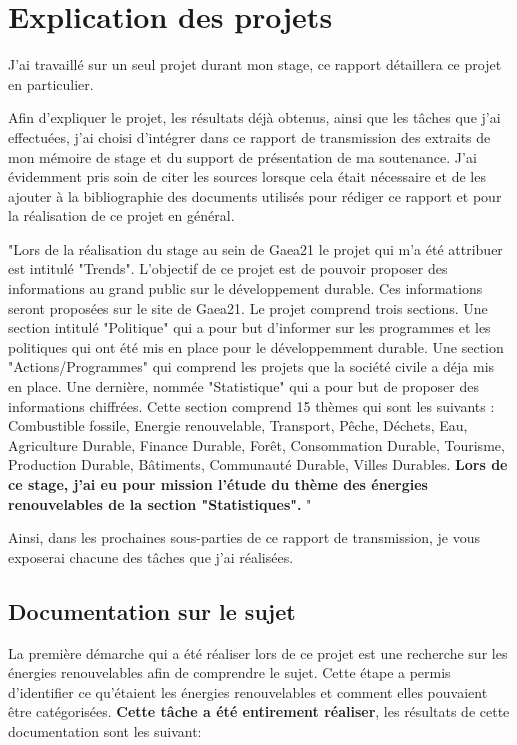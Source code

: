 \documentclass[12pt]{article}
\begin{document}
\section{Explication des projets}

J'ai travaillé sur un seul projet durant mon stage,
 ce rapport détaillera ce projet en particulier. \newline

 Afin d'expliquer le projet, les résultats déjà obtenus, 
 ainsi que les tâches que j'ai effectuées, j'ai choisi 
 d'intégrer dans ce rapport de transmission des extraits 
 de mon mémoire de stage et du support de présentation de 
 ma soutenance. J'ai évidemment pris soin de citer les sources 
 lorsque cela était nécessaire et de les ajouter à la bibliographie 
 des documents utilisés pour rédiger ce rapport et pour la 
 réalisation de ce projet en général.\newline

"Lors de la réalisation du stage au sein de Gaea21 le projet 
qui m'a été attribuer est 
intitulé "Trends".
L'objectif de ce projet
est de pouvoir proposer des informations au grand public sur le développement durable. 
Ces informations seront proposées sur le site de Gaea21. Le projet comprend 
trois sections. 
Une section intitulé "Politique" qui a pour but d'informer sur 
les programmes et les politiques qui ont été mis en place pour le
développemment durable. 
Une section  "Actions/Programmes" qui comprend les projets 
que la société civile a déja mis en place. 
Une dernière, nommée "Statistique" qui a pour but de proposer 
des informations chiffrées. 
Cette section comprend
15 thèmes qui sont les suivants : Combustible fossile, 
Energie renouvelable,
Transport, Pêche, Déchets, Eau, Agriculture Durable, Finance Durable, Forêt, 
Consommation Durable, Tourisme, Production Durable, Bâtiments, Communauté Durable, 
Villes Durables. \textbf{Lors de ce stage, j'ai eu pour mission l'étude du thème des énergies renouvelables 
de la section "Statistiques". }"\cite{memoir} \newline

Ainsi, dans les prochaines sous-parties de ce rapport de transmission, 
je vous exposerai chacune des tâches que j'ai réalisées.


\subsection{Documentation sur le sujet}

La première démarche qui a été réaliser lors de ce projet est une recherche 
sur les énergies renouvelables afin de comprendre le sujet. 
Cette étape a permis d'identifier ce qu'étaient les énergies renouvelables 
et comment elles pouvaient être catégorisées. 
\textbf{Cette tâche a été entirement réaliser}, les résultats 
de cette documentation sont les suivant:\newline
\end{document}

